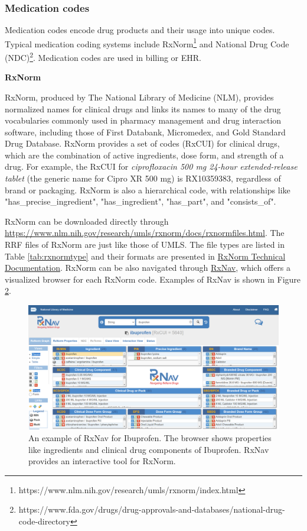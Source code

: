 \begin{figure}[ht]
    \label{fig:hpo_annotate_example}
\end{figure}


\subsubsection{Medication codes}
Medication codes encode drug products and their usage into unique codes. Typical medication coding systems include RxNorm\footnote{https://www.nlm.nih.gov/research/umls/rxnorm/index.html} and National Drug Code (NDC)\footnote{https://www.fda.gov/drugs/drug-approvals-and-databases/national-drug-code-directory}. Medication codes are used in billing or EHR.

\textbf{RxNorm}

RxNorm, produced by The National Library of Medicine (NLM), provides normalized names for clinical drugs and links its names to many of the drug vocabularies commonly used in pharmacy management and drug interaction software, including those of First Databank, Micromedex, and Gold Standard Drug Database. RxNorm provides a set of codes (RxCUI) for clinical drugs, which are the combination of active ingredients, dose form, and strength of a drug. For example, the RxCUI for \textit{ciprofloxacin 500 mg 24-hour extended-release tablet} (the generic name for Cipro XR 500 mg) is RX10359383, regardless of brand or packaging. RxNorm is also a hierarchical code, with relationships like "has\_precise\_ingredient", "has\_ingredient", "has\_part", and "consists\_of". 

RxNorm can be downloaded directly through \url{https://www.nlm.nih.gov/research/umls/rxnorm/docs/rxnormfiles.html}. The RRF files of RxNorm are just like those of UMLS. The file types are listed in Table \ref{tab:rxnormtype} and their formats are presented in \href{https://www.nlm.nih.gov/research/umls/rxnorm/docs/techdoc.html#s12_0}{RxNorm Technical Documentation}. RxNorm can be also navigated through \href{https://mor.nlm.nih.gov/RxNav/}{RxNav}, which offers a visualized browser for each RxNorm code. Examples of RxNav is shown in Figure \ref{fig:rxnav}.

\begin{figure}[ht]
    \centering
    \includegraphics[width=0.9\linewidth]{images/rxnav.png}
    \caption{An example of RxNav for Ibuprofen. The browser shows properties like ingredients and clinical drug components of Ibuprofen. RxNav provides an interactive tool for RxNorm.}
    \label{fig:rxnav}
\end{figure}

